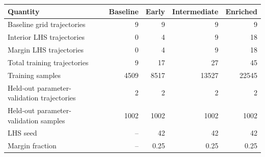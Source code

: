 \begin{tabular}{lrrrr}
\toprule
Quantity & Baseline & Early & Intermediate & Enriched \\
\midrule
Baseline grid trajectories & 9 & 9 & 9 & 9 \\
Interior LHS trajectories & 0 & 4 & 9 & 18 \\
Margin LHS trajectories & 0 & 4 & 9 & 18 \\
Total training trajectories & 9 & 17 & 27 & 45 \\
Training samples & 4509 & 8517 & 13527 & 22545 \\
Held-out parameter-validation trajectories & 2 & 2 & 2 & 2 \\
Held-out parameter-validation samples & 1002 & 1002 & 1002 & 1002 \\
LHS seed & -- & 42 & 42 & 42 \\
Margin fraction & -- & 0.25 & 0.25 & 0.25 \\
\bottomrule
\end{tabular}

